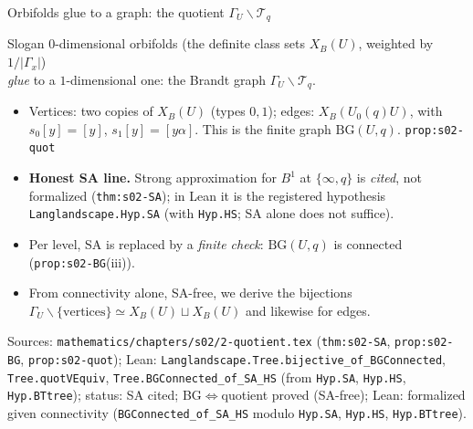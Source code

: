\begin{frame}{Orbifolds glue to a graph: the quotient $\Gamma_U\backslash\mathcal T_q$}
  \begin{block}{Slogan}
    \centering
    $0$-dimensional orbifolds (the definite class sets $X_B(U)$, weighted by $1/|\Gamma_x|$)\\
    \emph{glue} to a $1$-dimensional one: the Brandt graph $\Gamma_U\backslash\mathcal T_q$.
  \end{block}
  \begin{itemize}\small
    \item Vertices: two copies of $X_B(U)$ (types $0,1$); edges: $X_B(U_0(q)U)$, with
      $s_0[y]=[y]$, $s_1[y]=[y\alpha]$. This is the finite graph $\mathrm{BG}(U,q)$.
      \hfill{\scriptsize\texttt{prop:s02-quot}}
    \item \textbf{Honest SA line.} Strong approximation for $B^1$ at $\{\infty,q\}$ is
      \emph{cited}, not formalized (\texttt{thm:s02-SA}); in Lean it is the registered hypothesis
      \texttt{Langlandscape.Hyp.SA} (with \texttt{Hyp.HS}; SA alone does not suffice).
    \item Per level, SA is replaced by a \emph{finite check}: $\mathrm{BG}(U,q)$ is connected
      (\texttt{prop:s02-BG}(iii)).
    \item From connectivity alone, SA-free, we derive the bijections
      $\Gamma_U\backslash\{\text{vertices}\}\simeq X_B(U)\sqcup X_B(U)$ and likewise for edges.
  \end{itemize}
  \vfill
  {\tiny Sources: \texttt{mathematics/chapters/s02/2-quotient.tex} (\texttt{thm:s02-SA}, \texttt{prop:s02-BG}, \texttt{prop:s02-quot});
  Lean: \texttt{Langlandscape.Tree.bijective\_of\_BGConnected}, \texttt{Tree.quotVEquiv}, \texttt{Tree.BGConnected\_of\_SA\_HS}
  (from \texttt{Hyp.SA}, \texttt{Hyp.HS}, \texttt{Hyp.BTtree}); status: SA cited; BG$\Leftrightarrow$quotient proved (SA-free); Lean: formalized given connectivity (\texttt{BGConnected\_of\_SA\_HS} modulo \texttt{Hyp.SA}, \texttt{Hyp.HS}, \texttt{Hyp.BTtree}).}
\end{frame}

